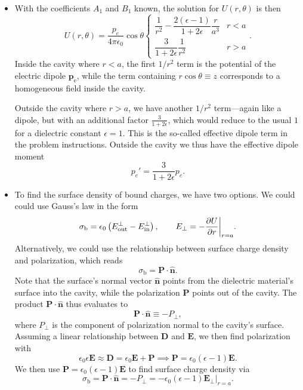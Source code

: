 \documentclass[11pt, a4paper]{article}
\renewcommand{\vec}[1]{\bm{#1}} %
\newcommand{\uvec}[1]{\hat{\vec{#1}}} %
\newcommand{\E}{\vec{E}}  %
\newcommand{\D}{\vec{D}}  %
\newcommand{\e}{\epsilon}
\newcommand{\ee}{\epsilon_{0}}  %
\newcommand{\pe}{\vec{p}_{\text{e}}}  %
\renewcommand{\P}{\vec{P}}  %
\begin{document}
\begin{itemize}
	\item With the coefficients $ A_{1} $ and $ B_{1} $ known, the solution for $ U(r, \theta) $ is then
	\begin{equation*}
		U(r, \theta) = \frac{p_{e}}{4\pi \ee}\cos \theta
		\begin{cases}
			\dfrac{1}{r^{2}} - \dfrac{2(\e - 1)}{1 + 2\e}\dfrac{r}{a^{3}} & r < a\\[2mm]
			\dfrac{3}{1 + 2\e} \dfrac{1}{r^{2}} & r > a
		\end{cases}.
	\end{equation*}
	Inside the cavity where $ r < a $, the first $ 1/r^{2} $ term is the potential of the electric dipole $ \pe $, while the term containing $  r \cos \theta \equiv z $ corresponds to a homogeneous field inside the cavity. 
	
	Outside the cavity where $ r > a $, we have another $ 1/r^{2} $ term---again like a dipole, but with an additional factor $ \frac{3}{1 + 2\e} $, which would reduce to the usual $ 1 $ for a dielectric constant $ \e = 1 $. This is the so-called effective dipole term in the problem instructions. Outside the cavity we thus have the effective dipole moment
	\begin{equation*}
		p_{e}' = \frac{3}{1 + 2\e}p_{e}.
	\end{equation*}
	
	\item To find the surface density of bound charges, we have two options. We could could use Gauss's law in the form
	\begin{equation*}
		\sigma_{\mathrm{b}} = \ee \left(E^{\mathrm{\perp}}_{\text{out}} - E^{\mathrm{\perp}}_{\text{in}}\right), \qquad E_{\perp} = -\pdv{U}{r} \bigg |_{r = a}.
	\end{equation*}
	Alternatively, we could use the relationship between surface charge density and polarization, which reads
	\begin{equation*}
		\sigma_{\mathrm{b}} = \P \cdot \uvec{n}.
	\end{equation*}
	Note that the surface's normal vector $ \uvec{n} $ points from the dielectric material's surface into the cavity, while the polarization $ \P $ points out of the cavity. The product $  \P \cdot \uvec{n} $ thus evaluates to
	\begin{equation*}
		 \P \cdot \uvec{n} \equiv - P_{\perp},
	\end{equation*}
	where $ P_{\perp} $ is the component of polarization normal to the cavity's surface. Assuming a linear relationship between $ \D $ and $ \E $, we then find polarization with
	\begin{equation*}
		\ee \e \E  \approx \D = \ee \E + \P \implies \P = \ee (\e - 1)\E.
	\end{equation*}
	We then use $ \P = \ee (\e - 1)\E $ to find surface charge density via
	\begin{equation*}
		\sigma_{\mathrm{b}} = \P \cdot \uvec{n} = -P_{\perp} = -\ee(\e - 1)\E_{\perp}\big |_{r = a}.
	\end{equation*}
\end{itemize}
\end{document}
